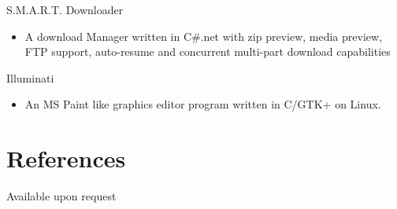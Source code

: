 \documentclass[a4paper,margin,line]{resume}
\begin{document}
\begin{resume}
S.M.A.R.T. Downloader
\begin{itemize}
	\item A download Manager written in C\#.net with zip preview, media preview, FTP support, auto-resume and concurrent multi-part download capabilities
\end{itemize}

Illuminati
\begin{itemize}
	\item An MS Paint like graphics editor program written in C/GTK+ on Linux.
\end{itemize}


\section{\mysidestyle References} 

Available upon request


\end{resume}
\end{document}
